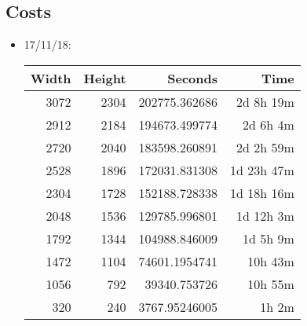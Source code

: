 \subsection{Costs}
\begin{itemize}
  \item 17/11/18:
  \begin{center}
  \begin{tabular}{ r r | r r }
  Width & Height & Seconds & Time \\ \hline
  3072 & 2304 & 202775.362686 & 2d 8h 19m \\
  2912 & 2184 & 194673.499774 & 2d 6h 4m \\
  2720 & 2040 & 183598.260891 & 2d 2h 59m \\
  2528 & 1896 & 172031.831308 & 1d 23h 47m \\
  2304 & 1728 & 152188.728338 & 1d 18h 16m \\
  2048 & 1536 & 129785.996801 & 1d 12h 3m \\
  1792 & 1344 & 104988.846009 & 1d 5h 9m \\
  1472 & 1104 & 74601.1954741 & 10h 43m \\
  1056 & 792 & 39340.753726 & 10h 55m \\
  320 & 240 & 3767.95246005 & 1h 2m \\
  \end{tabular}
  \end{center}
\end{itemize}

